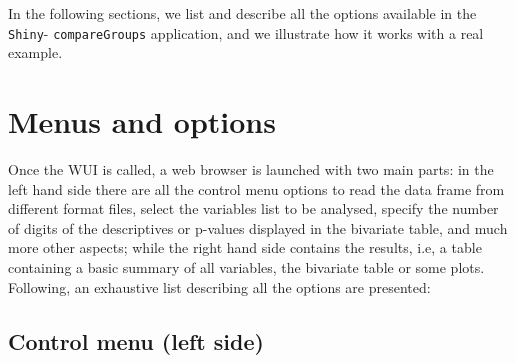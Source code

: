 \documentclass[11pt]{article}
\begin{document}
In the following sections, we list and describe all the options available in the {\tt Shiny}- {\tt compareGroups} application, and we illustrate how it works with a real example.




\section{Menus and options} \label{section-menus}

Once the WUI is called, a web browser is launched with two main parts: in the left hand side there are all the control menu options to read the data frame from different format files, select the variables list to be analysed, specify the number of digits of the descriptives or p-values displayed in the bivariate table, and much more other aspects; while the right hand side contains the results, i.e, a table containing a basic summary of all variables, the bivariate table or some plots.\\

Following, an exhaustive list describing all the options are presented:


\subsection{Control menu (left side)}
\end{document}
